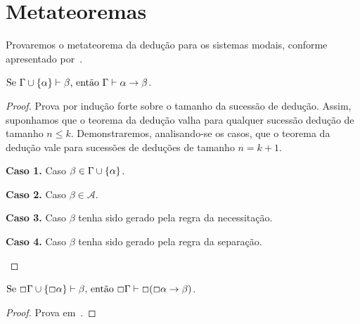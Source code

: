 \section{Metateoremas}
    Provaremos o metateorema da dedução para os sistemas modais, conforme apresentado por~\cite{Hakli}.

    \begin{theorem}
        $\text{Se }\Gamma\cup\{\alpha\}\vdash\beta\text{, então }\Gamma\vdash\alpha\to\beta$.

        \begin{proof}
            Prova por indução forte sobre o tamanho da sucessão de dedução.
            Assim, suponhamos que o teorema da dedução valha para qualquer sucessão dedução de tamanho $n\leq k$.
            Demonstraremos, analisando-se os casos, que o teorema da dedução vale para sucessões de deduções de tamanho $n=k+1$.

            \begin{case}
                \textbf{Caso 1.} Caso $\beta\in\Gamma\cup\{\alpha\}$.
            \end{case}

            \begin{case}
                \textbf{Caso 2.} Caso $\beta\in\mathcal{A}$.
            \end{case}

            \begin{case}
                \textbf{Caso 3.} Caso $\beta$ tenha sido gerado pela regra da necessitação.
            \end{case}

            \begin{case}
                \textbf{Caso 4.} Caso $\beta$ tenha sido gerado pela regra da separação.
            \end{case}
        \end{proof}
    \end{theorem}

    \begin{theorem}
        $\text{Se }\Box\Gamma\cup\{\Box\alpha\}\vdash\beta\text{, então }\Box\Gamma\vdash\Box(\Box\alpha\to\beta)$.

        \begin{proof}
            Prova em~\cite{Marcus}.
        \end{proof}
    \end{theorem}


